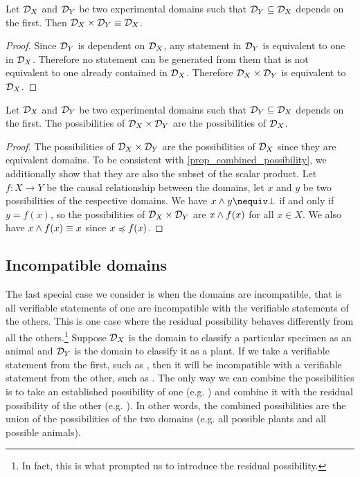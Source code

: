 \documentclass[11pt,letterpaper,fleqn]{memoir} %
\begin{document}
\begin{mathSection}
	\begin{prop}
		Let $\mathcal{D}_X$ and $\mathcal{D}_Y$ be two experimental domains such that $\mathcal{D}_Y \subseteq \mathcal{D}_X$ depends on the first. Then $\mathcal{D}_X \times \mathcal{D}_Y \equiv \mathcal{D}_X$.
	\end{prop}
	\begin{proof}
		Since $\mathcal{D}_Y$ is dependent on $\mathcal{D}_X$, any statement in $\mathcal{D}_Y$ is equivalent to one in $\mathcal{D}_X$. Therefore no statement can be generated from them that is not equivalent to one already contained in $\mathcal{D}_X$. Therefore $\mathcal{D}_X \times \mathcal{D}_Y$ is equivalent to $\mathcal{D}_X$. 
	\end{proof}
	\begin{coro}
		Let $\mathcal{D}_X$ and $\mathcal{D}_Y$ be two experimental domains such that $\mathcal{D}_Y \subseteq \mathcal{D}_X$ depends on the first. The possibilities of $\mathcal{D}_X \times \mathcal{D}_Y$ are the possibilities of $\mathcal{D}_X$.
	\end{coro}
	\begin{proof}
		The possibilities of $\mathcal{D}_X \times \mathcal{D}_Y$ are the possibilities of $\mathcal{D}_X$ since they are equivalent domains. To be consistent with \ref{prop_combined_possibility}, we additionally show that they are also the subset of the scalar product. Let $f : X \to Y$ be the causal relationship between the domains, let $x$ and $y$ be two possibilities of the respective domains. We have $x \AND y \nequiv \contradiction$ if and only if $y = f(x)$, so the possibilities of $\mathcal{D}_X \times \mathcal{D}_Y$ are $x \wedge f(x)$ for all $x \in X$. We also have $x \wedge f(x) \equiv x$ since $x \preccurlyeq f(x)$.
	\end{proof}
\end{mathSection}


\subsection{Incompatible domains}

The last special case we consider is when the domains are incompatible, that is all verifiable statements of one are incompatible with the verifiable statements of the others. This is one case where the residual possibility behaves differently from all the others.\footnote{In fact, this is what prompted us to introduce the residual possibility.} Suppose $\mathcal{D}_X$ is the domain to classify a particular specimen as an animal and $\mathcal{D}_Y$ is the domain to classify it as a plant. If we take a verifiable statement from the first, such as , then it will be incompatible with a verifiable statement from the other, such as . The only way we can combine the possibilities is to take an established possibility of one (e.g. ) and combine it with the residual possibility of the other (e.g. ). In other words, the combined possibilities are the union of the possibilities of the two domains (e.g. all possible plants and all possible animals).
\end{document}
